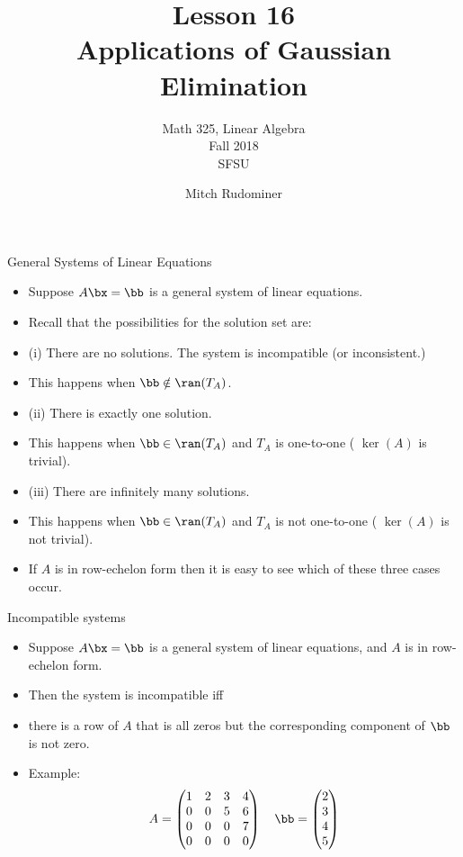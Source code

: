 \documentclass{beamer}
\title{Lesson 16 \\ Applications of Gaussian Elimination}
\subtitle{Math 325, Linear Algebra \\ Fall 2018 \\ SFSU}
\author{Mitch Rudominer}
\date{}
\begin{document}
\begin{frame}
  \titlepage
\end{frame}


\begin{frame}{General Systems of Linear Equations}

\begin{itemize}
\item Suppose $A\bx=\bb$ is a general system of linear equations.
\item Recall that the possibilities for the solution set are:
\item (i) There are no solutions. The system is incompatible (or inconsistent.)
\item This happens when $\bb\notin\ran(T_A)$.
\item (ii) There is exactly one solution.
\item This happens when $\bb\in\ran(T_A)$  and $T_A$ is one-to-one ( $\ker(A)$ is trivial).
\item (iii) There are infinitely many solutions.
\item This happens when $\bb\in\ran(T_A)$  and $T_A$ is not one-to-one ( $\ker(A)$ is not trivial).
\item If $A$ is in row-echelon form then it is easy to see which of these three cases occur.
\end{itemize}
\end{frame}


\begin{frame}{Incompatible systems}

\begin{itemize}
\item Suppose $A\bx=\bb$ is a general system of linear equations, and $A$ is in row-echelon form.
\item Then the system is incompatible iff
\item there is a row of $A$ that is all zeros but the corresponding component of $\bb$ is not zero.
\item Example:
$$
A =
\begin{pmatrix}
1 & 2 & 3 & 4 \\
0 & 0 & 5 & 6 \\
0 & 0 & 0 & 7 \\
0 & 0 & 0 & 0 \\
\end{pmatrix}
\quad
\bb=
\begin{pmatrix}
2 \\ 3 \\ 4 \\ 5
\end{pmatrix}
$$

\end{itemize}
\end{frame}
\end{document}
